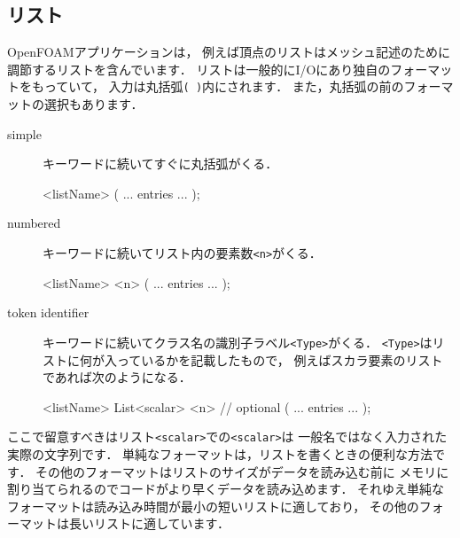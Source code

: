 \subsection{リスト}
\label{ssec:4.2.4}
OpenFOAMアプリケーションは，
例えば頂点のリストはメッシュ記述のために調節するリストを含んでいます．
リストは一般的にI/Oにあり独自のフォーマットをもっていて，
入力は丸括弧\verb|( )|内にされます．
また，丸括弧の前のフォーマットの選択もあります．
\begin{description}
 \item[simple]
            キーワードに続いてすぐに丸括弧がくる．
\begin{OFverbatim}[file]
    <listName>
    (
        ... entries ...
    );
\end{OFverbatim}
 \item[numbered]
            キーワードに続いてリスト内の要素数\verb|<n>|がくる．
\begin{OFverbatim}[file]
    <listName>
    <n>
    (
        ... entries ...
    );
\end{OFverbatim}
 \item[token identifier]
            キーワードに続いてクラス名の識別子ラベル\verb|<Type>|がくる．
            \verb|<Type>|はリストに何が入っているかを記載したもので，
            例えばスカラ要素のリストであれば次のようになる．
\begin{OFverbatim}[file]
    <listName>
    List<scalar>
    <n>        // optional
    (
        ... entries ...
    );
\end{OFverbatim}
\end{description}
ここで留意すべきはリスト\verb|<scalar>|での\verb|<scalar>|は
一般名ではなく入力された実際の文字列です．
単純なフォーマットは，リストを書くときの便利な方法です．
その他のフォーマットはリストのサイズがデータを読み込む前に
メモリに割り当てられるのでコードがより早くデータを読み込めます．
それゆえ単純なフォーマットは読み込み時間が最小の短いリストに適しており，
その他のフォーマットは長いリストに適しています．


